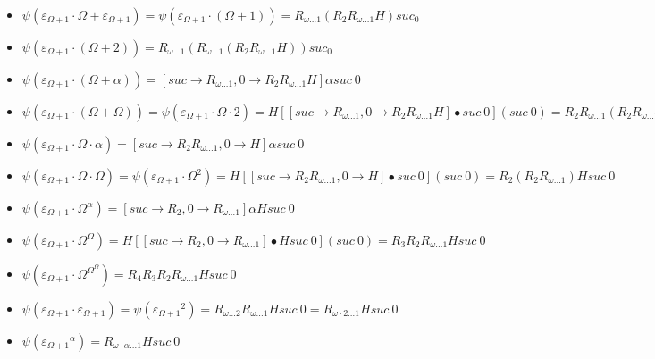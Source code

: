 \documentclass[10pt]{article}
\begin{document}
\begin{itemize}
\item \( \psi(\varepsilon_{\Omega+1} \cdot \Omega+\varepsilon_{\Omega+1}) = \psi(\varepsilon_{\Omega+1} \cdot (\Omega+1)) = R_{\omega \ldots 1} (R_2 R_{\omega \ldots 1} H) suc_ 0 \)

\item \( \psi(\varepsilon_{\Omega+1} \cdot (\Omega+2)) = R_{\omega \ldots 1} (R_{\omega \ldots 1} (R_2 R_{\omega \ldots 1} H)) suc_ 0 \)

\item \( \psi(\varepsilon_{\Omega+1} \cdot (\Omega+\alpha)) = [suc \rightarrow R_{\omega \ldots 1}, 0 \rightarrow R_2 R_{\omega \ldots 1} H] \alpha suc\ 0 \)

\item \( \psi(\varepsilon_{\Omega+1} \cdot (\Omega+\Omega)) = \psi(\varepsilon_{\Omega+1} \cdot \Omega \cdot 2) = H [[suc \rightarrow R_{\omega \ldots 1}, 0 \rightarrow R_2 R_{\omega \ldots 1} H] \bullet suc\ 0] (suc\ 0) = R_2 R_{\omega \ldots 1} (R_2 R_{\omega \ldots 1} H) suc\ 0 \)

\item \( \psi(\varepsilon_{\Omega+1} \cdot \Omega \cdot \alpha) = [suc \rightarrow R_2 R_{\omega \ldots 1}, 0 \rightarrow  H] \alpha suc\ 0 \)

\item \( \psi(\varepsilon_{\Omega+1} \cdot \Omega \cdot \Omega) = \psi(\varepsilon_{\Omega+1} \cdot \Omega^2) = H [[suc \rightarrow R_2 R_{\omega \ldots 1}, 0 \rightarrow  H] \bullet suc\ 0] (suc\ 0) = R_2 (R_2 R_{\omega \ldots 1}) H suc\ 0 \)

\item \( \psi(\varepsilon_{\Omega+1} \cdot \Omega^\alpha) = [suc \rightarrow R_2, 0 \rightarrow R_{\omega \ldots 1}] \alpha H suc\ 0 \)

\item \( \psi(\varepsilon_{\Omega+1} \cdot \Omega^\Omega) = H [[suc \rightarrow R_2, 0 \rightarrow R_{\omega \ldots 1}] \bullet H suc\ 0] (suc\ 0) = R_3 R_2 R_{\omega \ldots 1} H suc\ 0 \)

\item \( \psi(\varepsilon_{\Omega+1} \cdot \Omega^{\Omega^\Omega}) = R_4 R_3 R_2 R_{\omega \ldots 1} H suc\ 0 \)

\item \( \psi(\varepsilon_{\Omega+1} \cdot \varepsilon_{\Omega+1}) = \psi({\varepsilon_{\Omega+1}}^2) = R_{\omega \ldots 2}  R_{\omega \ldots 1} H suc\ 0 = R_{\omega \cdot 2 \ldots 1} H suc\ 0 \)

\item \( \psi({\varepsilon_{\Omega+1}}^\alpha) = R_{\omega \cdot \alpha \ldots 1} H suc\ 0 \)


\end{itemize}
\end{document}
